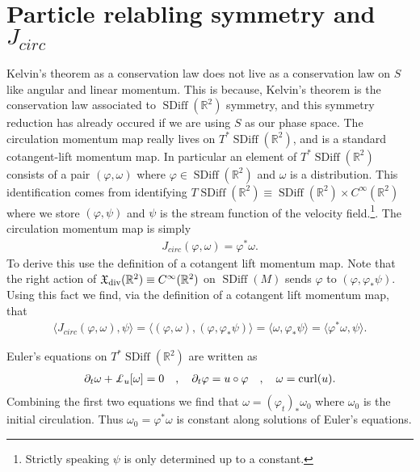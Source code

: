 \documentclass[12pt]{amsart}
\DeclareMathOperator{\SDiff}{SDiff}
\begin{document}
\section{Particle relabling symmetry and $J_{circ}$}
Kelvin's theorem as a conservation law does not live as a conservation law on $S$ like angular and linear momentum.
This is because, Kelvin's theorem is the conservation law associated to $\SDiff(\mathbb{R}^2)$ symmetry, and this symmetry reduction has already occured if we are using $S$ as our phase space.
The circulation momentum map really lives on $T^* \SDiff(\mathbb{R}^2)$,
and is a standard cotangent-lift momentum map.
In particular an element of $T^*\SDiff( \mathbb{R}^2)$ consists of a pair $(\varphi , \omega)$ where $\varphi \in \SDiff(\mathbb{R}^2)$ and $\omega$ is a distribution.  This identification comes from identifying $T\SDiff(\mathbb{R}^2) \equiv \SDiff(\mathbb{R}^2) \times C^{\infty}(\mathbb{R}^2)$
where we store $(\varphi, \psi)$ and $\psi$ is the stream function of the velocity field.\footnote{Strictly speaking $\psi$ is only determined up to a constant.}.  The circulation momentum map is simply
\begin{align*}
  J_{circ}( \varphi, \omega) = \varphi^* \omega.
\end{align*}
To derive this use the definition of a cotangent lift momentum map.
Note that the right action of $\mathfrak{X}_{\rm div}(\mathbb{R}^2) \equiv C^{\infty}(\mathbb{R}^2)$ on $\SDiff(M)$ sends $\varphi$ to $(\varphi , \varphi_* \psi)$.  Using this fact we find, via the definition of a cotangent lift momentum map, that
\begin{align*}
  \langle J_{circ}(\varphi,\omega) , \psi \rangle
  = \langle (\varphi,\omega) , (\varphi,\varphi_*\psi) \rangle 
  = \langle \omega , \varphi_*\psi \rangle = \langle \varphi^* \omega, \psi \rangle.
\end{align*}

Euler's equations on $T^*\SDiff(\mathbb{R}^2)$ are written as
\begin{align*}
  \partial_t \omega + \pounds_u [\omega] = 0 \quad,\quad \partial_t \varphi = u \circ \varphi\quad,\quad \omega = {\rm curl}(u).
\end{align*}
Combining the first two equations we find that $\omega = (\varphi_t)_*\omega_0$ where $\omega_0$ is the initial circulation.  Thus $\omega_0 = \varphi^*\omega$ is constant along solutions of Euler's equations.
\end{document}
